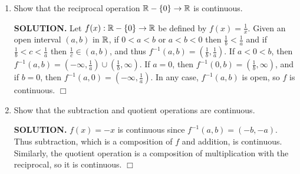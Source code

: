 \documentclass{article}
\begin{document}
\begin{enumerate}
\begin{enumerate}
        \item Show that the reciprocal operation $\mathbb{R} - \{0\} \rightarrow \mathbb{R}$ is continuous.

        {\bf SOLUTION.} Let $f(x): \mathbb{R} - \{0\} \rightarrow \mathbb{R}$ be defined by $f(x) = \frac1x.$ Given an open interval $(a, b)$ in $\mathbb{R}$, if $0 < a < b$ or $a < b< 0$ then $\frac1b < \frac1a$ and if $\frac1b < c < \frac1a$ then $\frac1c \in (a, b)$, and thus $f^{-1}(a, b) = (\frac1b, \frac1a)$. If $a < 0 < b$, then $f^{-1}(a, b) = (-\infty, \frac1a) \cup(\frac1b, \infty)$. If $a = 0$, then $f^{-1}(0, b) = (\frac1b, \infty)$, and if $b = 0$, then $f^{-1}(a, 0) = (-\infty, \frac1a)$. In any case, $f^{-1}(a, b)$ is open, so $f$ is continuous. $\Box$

        \item Show that the subtraction and quotient operations are continuous.

        {\bf SOLUTION.} $f(x) = -x$ is continuous since $f^{-1}(a, b) = (-b, -a)$. Thus subtraction, which is a composition of $f$ and addition, is continuous. Similarly, the quotient operation is a composition of multiplication with the reciprocal, so it is continuous. $\Box$
    \end{enumerate}
\end{enumerate}
\end{document}
